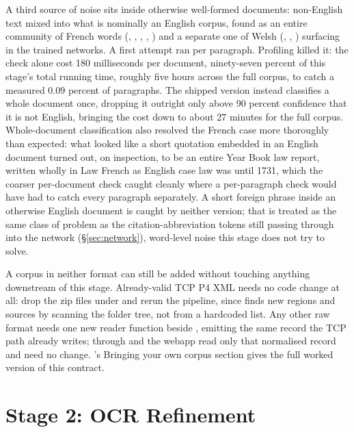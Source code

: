 \documentclass[11pt]{article}
\begin{document}
A third source of noise sits inside otherwise well-formed documents:
non-English text mixed into what is nominally an English corpus, found
as an entire community of French words
(, , , , ) and a
separate one of Welsh (, , )
surfacing in the trained networks. A first attempt ran 
per paragraph. Profiling killed it: the check alone cost 180
milliseconds per document, ninety-seven percent of this stage's total
running time, roughly five hours across the full corpus, to catch a
measured 0.09 percent of paragraphs. The shipped version instead
classifies a whole document once, dropping it outright only above 90
percent confidence that it is not English, bringing the cost down to
about 27 minutes for the full corpus. Whole-document classification also
resolved the French case more thoroughly than expected: what looked like
a short quotation embedded in an English document turned out, on
inspection, to be an entire Year Book law report, written wholly in Law
French as English case law was until 1731, which the coarser
per-document check caught cleanly where a per-paragraph check would have
had to catch every paragraph separately. A short foreign phrase inside
an otherwise English document is caught by neither version; that is
treated as the same class of problem as the citation-abbreviation tokens
still passing through into the network (\S\ref{sec:network}), word-level
noise this stage does not try to solve.

A corpus in neither format can still be added without touching anything
downstream of this stage. Already-valid TCP P4 XML needs no code change
at all: drop the zip files under
and rerun the pipeline, since  finds new regions
and sources by scanning the folder tree, not from a hardcoded list. Any
other raw format needs one new reader function beside
, emitting the same
 record the TCP path
already writes;  through  and
the webapp read only that normalised record and need no change.
's Bringing your own corpus section gives the
full worked version of this contract.

\section{Stage 2: OCR Refinement}
\label{sec:ocr}
\end{document}
